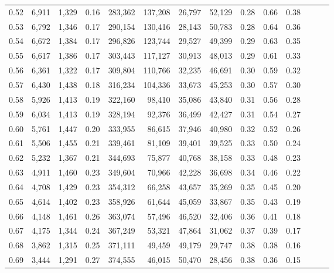 \begin{tabular}{rrrrrrrrrrrrrr}
0.52 &   6,911 &  1,329 &  0.16 &  283,362 &  137,208 &  26,797 &  52,129 &  0.28 &  0.66 &      0.38 \\
0.53 &   6,792 &  1,346 &  0.17 &  290,154 &  130,416 &  28,143 &  50,783 &  0.28 &  0.64 &      0.36 \\
0.54 &   6,672 &  1,384 &  0.17 &  296,826 &  123,744 &  29,527 &  49,399 &  0.29 &  0.63 &      0.35 \\
0.55 &   6,617 &  1,386 &  0.17 &  303,443 &  117,127 &  30,913 &  48,013 &  0.29 &  0.61 &      0.33 \\
0.56 &   6,361 &  1,322 &  0.17 &  309,804 &  110,766 &  32,235 &  46,691 &  0.30 &  0.59 &      0.32 \\
0.57 &   6,430 &  1,438 &  0.18 &  316,234 &  104,336 &  33,673 &  45,253 &  0.30 &  0.57 &      0.30 \\
0.58 &   5,926 &  1,413 &  0.19 &  322,160 &   98,410 &  35,086 &  43,840 &  0.31 &  0.56 &      0.28 \\
0.59 &   6,034 &  1,413 &  0.19 &  328,194 &   92,376 &  36,499 &  42,427 &  0.31 &  0.54 &      0.27 \\
0.60 &   5,761 &  1,447 &  0.20 &  333,955 &   86,615 &  37,946 &  40,980 &  0.32 &  0.52 &      0.26 \\
0.61 &   5,506 &  1,455 &  0.21 &  339,461 &   81,109 &  39,401 &  39,525 &  0.33 &  0.50 &      0.24 \\
0.62 &   5,232 &  1,367 &  0.21 &  344,693 &   75,877 &  40,768 &  38,158 &  0.33 &  0.48 &      0.23 \\
0.63 &   4,911 &  1,460 &  0.23 &  349,604 &   70,966 &  42,228 &  36,698 &  0.34 &  0.46 &      0.22 \\
0.64 &   4,708 &  1,429 &  0.23 &  354,312 &   66,258 &  43,657 &  35,269 &  0.35 &  0.45 &      0.20 \\
0.65 &   4,614 &  1,402 &  0.23 &  358,926 &   61,644 &  45,059 &  33,867 &  0.35 &  0.43 &      0.19 \\
0.66 &   4,148 &  1,461 &  0.26 &  363,074 &   57,496 &  46,520 &  32,406 &  0.36 &  0.41 &      0.18 \\
0.67 &   4,175 &  1,344 &  0.24 &  367,249 &   53,321 &  47,864 &  31,062 &  0.37 &  0.39 &      0.17 \\
0.68 &   3,862 &  1,315 &  0.25 &  371,111 &   49,459 &  49,179 &  29,747 &  0.38 &  0.38 &      0.16 \\
0.69 &   3,444 &  1,291 &  0.27 &  374,555 &   46,015 &  50,470 &  28,456 &  0.38 &  0.36 &      0.15 \\

\end{tabular}
